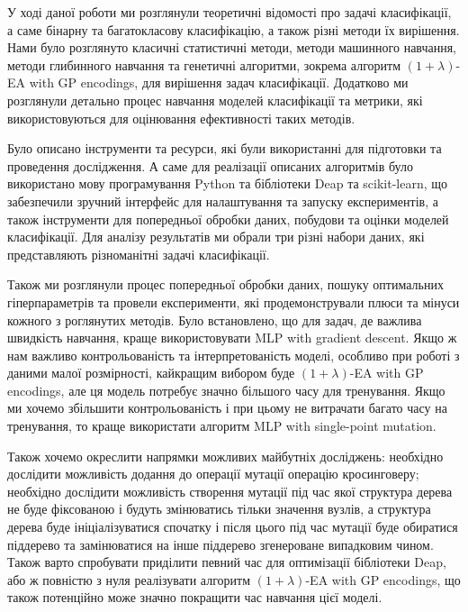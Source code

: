 У ході даної роботи ми розглянули теоретичні відомості про задачі класифікації, а саме бінарну та багатокласову класифікацію, а також різні методи їх вирішення. Нами було розглянуто класичні статистичні методи, методи машинного навчання, методи глибинного навчання та генетичні алгоритми, зокрема алгоритм $(1+\lambda)$-EA with GP encodings, для вирішення задач класифікації. Додатково ми розглянули детально процес навчання моделей класифікації та метрики, які використовуються для оцінювання ефективності таких методів.

Було описано інструменти та ресурси, які були використанні для підготовки та проведення дослідження. А саме для реалізації описаних алгоритмів було використано мову програмування Python та бібліотеки Deap та scikit-learn, що забезпечили зручний інтерфейс для налаштування та запуску експериментів, а також інструменти для попередньої обробки даних, побудови та оцінки моделей класифікації. Для аналізу результатів ми обрали три різні набори даних, які представляють різноманітні задачі класифікації.

Також ми розглянули процес попередньої обробки даних, пошуку оптимальних гіперпараметрів та провели експерименти, які продемонстрували плюси та мінуси кожного з роглянутих методів. Було встановлено, що для задач, де важлива швидкість навчання, краще використовувати MLP with gradient descent. Якщо ж нам важливо контрольованість та інтерпретованість моделі, особливо при роботі з даними малої розмірності, кайкращим вибором буде $(1+\lambda)$-EA with GP encodings, але ця модель потребує значно більшого часу для тренування. Якщо ми хочемо збільшити контрольованість і при цьому не витрачати багато часу на тренування, то краще використати алгоритм MLP with single-point mutation.

Також хочемо окреслити напрямки можливих майбутніх досліджень: необхідно дослідити можливість додання до операції мутації операцію кросинговеру; необхідно дослідити можливість створення мутації під час якої структура дерева не буде фіксованою і будуть змінюватись тільки значення вузлів, а структура дерева буде ініціалізуватися спочатку і після цього під час мутації буде обиратися піддерево та замінюватися на інше піддерево згенероване випадковим чином. Також варто спробувати приділити певний час для оптимізації бібліотеки Deap, або ж повністю з нуля реалізувати алгоритм $(1+\lambda)$-EA with GP encodings, що також потенційно може значно покращити час навчання цієї моделі.